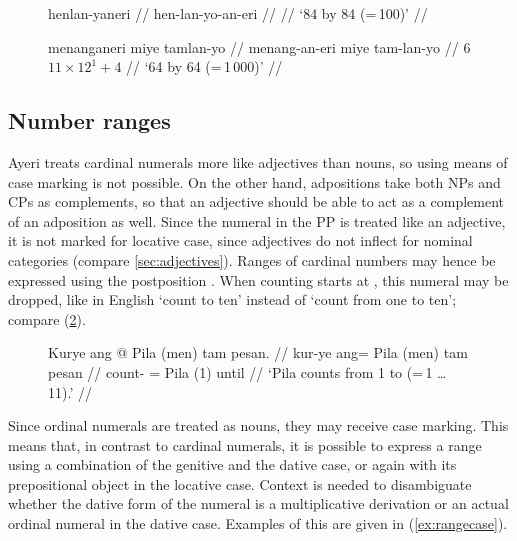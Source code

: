 \begin{figure}[h]
\pex\label{ex:distnuminfl}
\a\begingl
	\gla henlan-yaneri //
	\glb hen-lan-yo-an-eri //
	 //
	\glft `84 by 84 (=\,100)' //
\endgl

\a\begingl
	\gla menanganeri miye tamlan-yo //
	\glb menang-an-eri miye tam-lan-yo //
	 {$6$} {$11 \times 12^1 + 4$} //
	\glft `6\elv{}4 by 6\elv{}4 (=\,1\,000)' //
\endgl
\xe
\end{figure}

\subsection{Number ranges}

Ayeri treats cardinal numerals more like adjectives than nouns, so using means
of case marking is not possible. On the other hand, adpositions take both NPs
and CPs as complements, so that an adjective should be able to act as a
complement of an adposition as well. Since the numeral in the PP is treated
like an adjective, it is not marked for locative case, since adjectives do not
inflect for nominal categories (compare \autoref{sec:adjectives}). Ranges of
cardinal numbers may hence be expressed using the postposition
. When counting starts at ,
this numeral may be dropped, like in English `count to ten' instead of `count
from one to ten'; compare (\ref{ex:numstretch}).

\begin{figure}[h]
\ex\label{ex:numstretch}
\begingl
	\gla Kurye ang @ Pila \textup{(}men\textup{)} tam pesan. //
	\glb kur-ye ang= Pila (men) tam pesan //
	\glc count-\TsgF{} \Aarg{}= Pila (1) \elv{} until //
	\glft `Pila counts from 1 to \elv{} (=\,1 … 11).' //
\endgl
\xe
\end{figure}

Since ordinal numerals are treated as nouns, they may receive case marking.
This means that, in contrast to cardinal numerals, it is possible to express a
range using a combination of the genitive and the dative case, or again
 with its prepositional object in the locative case.
Context is needed to disambiguate whether the dative form of the numeral is a
multiplicative derivation or an actual ordinal numeral in the dative case.
Examples of this are given in (\ref{ex:rangecase}).

